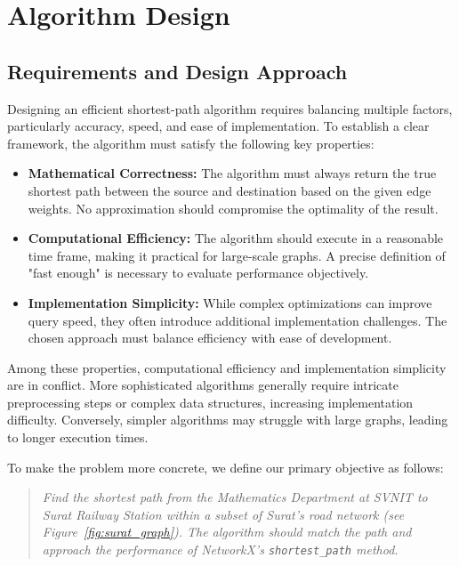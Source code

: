 \chapter{Algorithm Design}
	\section{Requirements and Design Approach}
	
	Designing an efficient shortest-path algorithm requires balancing multiple factors, particularly accuracy, speed, and ease of implementation. To establish a clear framework, the algorithm must satisfy the following key properties:
	
	\begin{itemize}
		\item \textbf{Mathematical Correctness:} The algorithm must always return the true shortest path between the source and destination based on the given edge weights. No approximation should compromise the optimality of the result.
		\item \textbf{Computational Efficiency:} The algorithm should execute in a reasonable time frame, making it practical for large-scale graphs. A precise definition of "fast enough" is necessary to evaluate performance objectively.
		\item \textbf{Implementation Simplicity:} While complex optimizations can improve query speed, they often introduce additional implementation challenges. The chosen approach must balance efficiency with ease of development.
	\end{itemize}
	
	Among these properties, computational efficiency and implementation simplicity are in conflict. More sophisticated algorithms generally require intricate preprocessing steps or complex data structures, increasing implementation difficulty. Conversely, simpler algorithms may struggle with large graphs, leading to longer execution times.
	
	To make the problem more concrete, we define our primary objective as follows:
	
	\begin{quote}
		\textit{Find the shortest path from the Mathematics Department at SVNIT to Surat Railway Station within a subset of Surat’s road network (see Figure~\ref{fig:surat_graph}). The algorithm should match the path and approach the performance of NetworkX’s \texttt{shortest\_path} method.}
	\end{quote}

